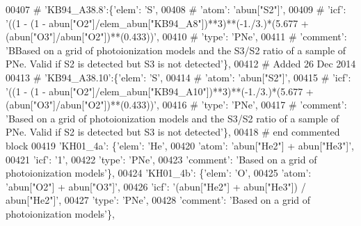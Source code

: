 \begin{DoxyCode}
00407 \textcolor{comment}{#                         'KB94\_A38.8':\{'elem': 'S',}
00408 \textcolor{comment}{#                                     'atom': 'abun["S2"]',}
00409 \textcolor{comment}{#                                     'icf': '((1 - (1 -
       abun["O2"]/elem\_abun["KB94\_A8"])**3)**(-1./3.)*(5.677 + (abun["O3"]/abun["O2"])**(0.433))',}
00410 \textcolor{comment}{#                                      'type': 'PNe',}
00411 \textcolor{comment}{#                                      'comment': 'BBased on a grid of photoionization models and the S3/S2
       ratio of a sample of PNe. Valid if S2 is detected but S3 is not detected'\},}
00412 \textcolor{comment}{# Added 26 Dec 2014}
00413 \textcolor{comment}{#                         'KB94\_A38.10':\{'elem': 'S',}
00414 \textcolor{comment}{#                                     'atom': 'abun["S2"]',}
00415 \textcolor{comment}{#                                     'icf': '((1 - (1 -
       abun["O2"]/elem\_abun["KB94\_A10"])**3)**(-1./3.)*(5.677 + (abun["O3"]/abun["O2"])**(0.433))',}
00416 \textcolor{comment}{#                                      'type': 'PNe',}
00417 \textcolor{comment}{#                                      'comment': 'Based on a grid of photoionization models and the S3/S2
       ratio of a sample of PNe. Valid if S2 is detected but S3 is not detected'\},}
00418 \textcolor{comment}{# end commented block}
00419                          \textcolor{stringliteral}{'KH01\_4a'}: \{\textcolor{stringliteral}{'elem'}: \textcolor{stringliteral}{'He'},
00420                                      \textcolor{stringliteral}{'atom'}: \textcolor{stringliteral}{'abun["He2"] + abun["He3"]'},
00421                                      \textcolor{stringliteral}{'icf'}: \textcolor{stringliteral}{'1'},
00422                                      \textcolor{stringliteral}{'type'}: \textcolor{stringliteral}{'PNe'},
00423                                      \textcolor{stringliteral}{'comment'}: \textcolor{stringliteral}{'Based on a grid of photoionization models'}\},
00424                          \textcolor{stringliteral}{'KH01\_4b'}: \{\textcolor{stringliteral}{'elem'}: \textcolor{stringliteral}{'O'},
00425                                      \textcolor{stringliteral}{'atom'}: \textcolor{stringliteral}{'abun["O2"] + abun["O3"]'},
00426                                      \textcolor{stringliteral}{'icf'}: \textcolor{stringliteral}{'(abun["He2"] + abun["He3"]) / abun["He2"]'},
00427                                      \textcolor{stringliteral}{'type'}: \textcolor{stringliteral}{'PNe'},
00428                                      \textcolor{stringliteral}{'comment'}: \textcolor{stringliteral}{'Based on a grid of photoionization models'}\},

\end{DoxyCode}
